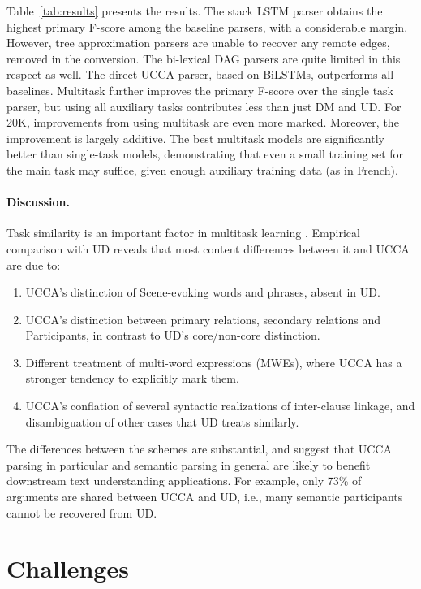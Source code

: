 \documentclass[12pt]{article}
\begin{document}
Table~\ref{tab:results} presents the results.
The stack LSTM parser obtains the highest primary F-score
among the baseline parsers, with a considerable margin. However,
tree approximation parsers are unable to recover any remote edges,
removed in the conversion.
The bi-lexical DAG parsers are quite limited in this respect as well.
The direct UCCA parser, based on BiLSTMs, outperforms all baselines.
Multitask further improves the primary F-score over the single task parser,
but using all auxiliary tasks contributes less than just DM and UD.
For 20K, improvements from using multitask are even more marked. 
Moreover, the improvement is largely additive.
The best multitask models are significantly better than single-task models,
demonstrating that even a small training set for the main task may suffice,
given enough auxiliary training data (as in French).

\paragraph{Discussion.}

Task similarity is an important factor in multitask learning
\cite{E17-2026,E17-1005}.
Empirical comparison with UD reveals that most content differences between it and UCCA are due to:
  \begin{enumerate}
      \item UCCA's distinction of Scene-evoking words and phrases, absent in UD.
      \item UCCA's distinction between primary relations, secondary relations
        and Participants, in contrast to UD's core/non-core distinction.
      \item Different treatment of multi-word expressions (MWEs),
        where UCCA has a stronger tendency to explicitly mark them.
      \item UCCA's conflation of several syntactic realizations of inter-clause linkage,
        and disambiguation of other cases that UD treats similarly.
   \end{enumerate}

  The differences between the schemes are substantial, and suggest that
  UCCA parsing in particular and semantic parsing in general are likely to benefit
  downstream text understanding applications.
  For example, only 73\% of arguments are shared between UCCA and UD,
  i.e., many semantic participants cannot be recovered from UD.


\section{Challenges}\label{sec:challenges}
\end{document}

